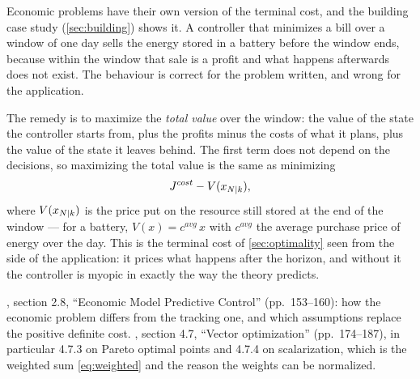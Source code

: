 Economic problems have their own version of the terminal cost, and the building case study
(\cref{sec:building}) shows it. A controller that minimizes a bill over a window of one day
sells the energy stored in a battery before the window ends, because within the window that
sale is a profit and what happens afterwards does not exist. The behaviour is correct for the
problem written, and wrong for the application.

The remedy is to maximize the \emph{total value} over the window: the value of the state the
controller starts from, plus the profits minus the costs of what it plans, plus the value of
the state it leaves behind. The first term does not depend on the decisions, so maximizing the
total value is the same as minimizing
\begin{equation}
  J^{cost} - V(x_{{N|k}}),
\end{equation}
where $V(x_{{N|k}})$ is the price put on the resource still stored at the end of the window ---
for a battery, $V(x) = c^{avg}\,x$ with $c^{avg}$ the average purchase price of energy over the
day. This is the terminal cost of \cref{sec:optimality} seen from the side of the application:
it prices what happens after the horizon, and without it the controller is myopic in exactly
the way the theory predicts.

\begin{reading}
, section 2.8, ``Economic Model Predictive Control'' (pp.~153--160): how
the economic problem differs from the tracking one, and which assumptions replace the positive
definite cost. , section 4.7, ``Vector optimization'' (pp.~174--187), in
particular 4.7.3 on Pareto optimal points and 4.7.4 on scalarization, which is the weighted sum
\eqref{eq:weighted} and the reason the weights can be normalized.
\end{reading}
